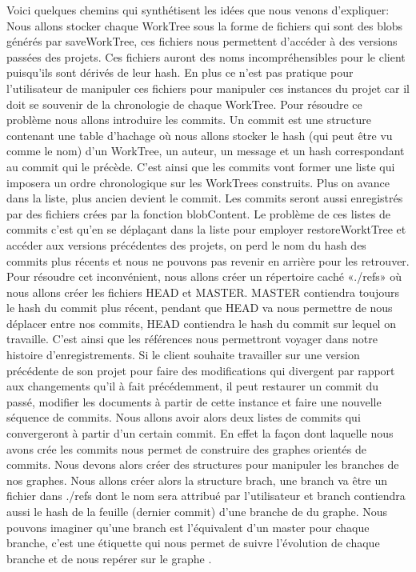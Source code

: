 \documentclass[12pt,francais]{article}
\begin{document}
Voici quelques chemins qui synthétisent les idées que nous venons d’expliquer: \newline \newline
	Nous allons stocker chaque WorkTree sous la forme de fichiers qui sont des blobs générés par saveWorkTree, ces fichiers nous permettent d’accéder à des versions passées des projets. Ces fichiers auront des noms incompréhensibles pour le client puisqu’ils sont dérivés de leur hash. En plus ce n’est pas pratique pour l’utilisateur de manipuler ces fichiers pour manipuler ces instances du projet car il doit se souvenir de la chronologie de chaque WorkTree. 
	Pour résoudre ce problème nous allons introduire les commits. Un commit est une structure contenant une table d’hachage où nous allons stocker le hash (qui peut être vu comme le nom) d’un WorkTree, un auteur, un message et un hash correspondant au commit qui le précède. C’est ainsi que les commits vont former une liste qui imposera un ordre chronologique sur les WorkTrees construits. Plus on avance dans la liste, plus ancien devient le commit. Les commits seront aussi enregistrés par des fichiers crées par la fonction blobContent. 
	Le problème de ces listes de commits c’est qu’en se déplaçant dans la liste pour employer restoreWorktTree et accéder aux versions précédentes des projets, on perd le nom du hash des commits plus récents et nous ne pouvons pas revenir en arrière pour les retrouver. Pour résoudre cet inconvénient, nous allons créer un répertoire caché «./refs» où nous allons créer les fichiers HEAD et MASTER. MASTER contiendra toujours le hash du commit plus récent, pendant que HEAD va nous permettre de nous déplacer entre nos commits, HEAD contiendra le hash du commit sur lequel on travaille. \newline \newline
	C’est ainsi que les références nous permettront voyager dans notre histoire d’enregistrements.  Si le client souhaite travailler sur une version précédente de son projet pour faire des modifications qui divergent par rapport aux changements qu’il à fait précédemment, il peut restaurer un commit du passé, modifier les documents à partir de cette instance et faire une nouvelle séquence de commits. Nous allons avoir alors deux listes de commits qui convergeront à partir d’un certain commit. En effet la façon dont laquelle nous avons crée les commits nous permet de construire des graphes orientés de commits. Nous devons alors créer des structures pour manipuler les branches de nos graphes. Nous allons créer alors la structure brach, une branch va être un fichier dans ./refs dont le nom sera attribué par l’utilisateur et branch contiendra  aussi le hash de la feuille (dernier commit) d’une branche de du graphe. Nous pouvons imaginer qu’une branch est l’équivalent d’un master pour chaque branche, c’est une étiquette qui nous permet de suivre l’évolution de chaque branche et de nous repérer sur le graphe .
\end{document}
